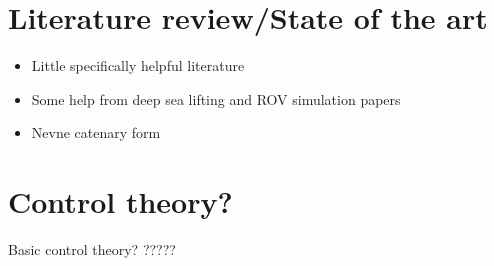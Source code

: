 \section{Literature review/State of the art}
\begin{itemize}
\item Little specifically helpful literature
\item Some help from deep sea lifting and ROV simulation papers
\item Nevne catenary form

\end{itemize}

\section{Control theory?}
Basic control theory? ?????